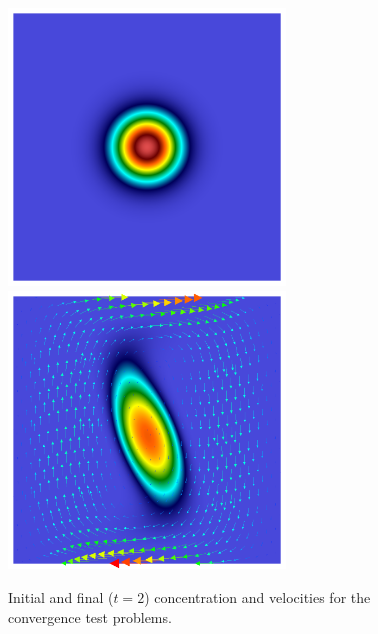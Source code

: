 \documentclass[final]{siamltex}
\begin{document}
\begin{figure}
\begin{center}
\includegraphics[width=2.9in]{gaussian_1}
\includegraphics[width=2.9in]{gaussian_2}
\caption{Initial and final ($t=2$) concentration and velocities for the convergence
test problems.}
\label{fig:convergence}
\end{center}
\end{figure}
\end{document}

